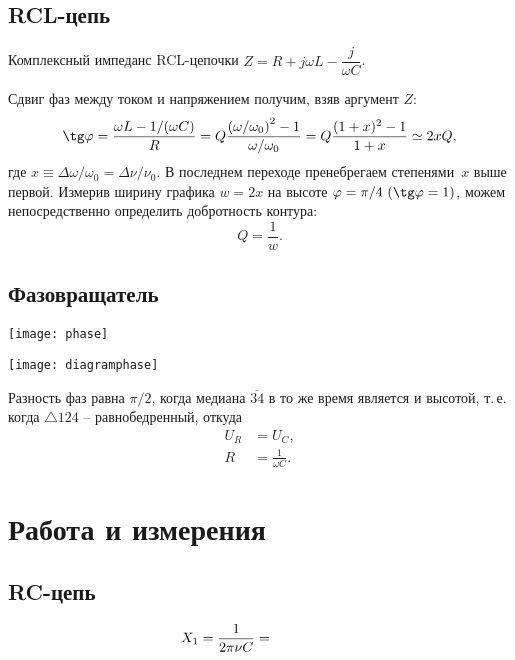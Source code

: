 \documentclass{physlab}
\begin{document}
\subsection*{RCL-цепь}

\vspace{-1.75ex}
Комплексный импеданс RCL-цепочки $Z=R+j\omega L - \dfrac{j}{\omega C}$.
\vspace{.75\parskip}

Сдвиг фаз между током и напряжением получим, взяв аргумент $Z$:
$$\tg\varphi = \frac{\omega L - 1/(\omega C)}{R} = Q\frac{\left(\omega/\omega_0\right)^2 - 1}{\omega/\omega_0} = Q\frac{(1+x)^2-1}{1+x} \simeq 2x Q,$$
где $x \equiv \Delta \omega / \omega_0 = \Delta \nu / \nu_0$.
В последнем переходе пренебрегаем степенями~$x$ выше первой.
Измерив ширину графика $w=2x$ на высоте $\varphi = \pi / 4\ (\tg\varphi = 1)$, можем непосредственно определить добротность контура:
$$Q = \frac{1}{w}.$$

\subsection*{Фазовращатель}

\vspace{-7.5mm}
\begin{minipage}{.65\tw}
    \texttt{[image: phase]}
\end{minipage}
\hfill
\begin{minipage}{.32\tw}
    \texttt{[image: diagramphase]}
\end{minipage}\smallskip

Разность фаз равна $\pi /2$, когда медиана $\overline{34}$ в то же время является и высотой, т.\,е. когда $\triangle 124$ -- равнобедренный, откуда
\begin{align}
    U_R &= U_C, \\
    R &= \frac{1}{\omega C}.
\end{align}

\section{Работа и измерения}

\subsection*{RC-цепь}

$$X_1 = \dfrac{1}{2 \pi \nu C} = \val$$
\end{document}
